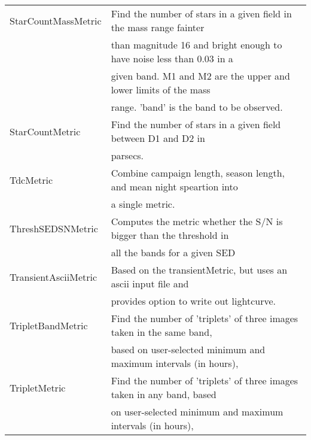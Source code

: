 \begin{table}
\begin{tabular}{ll}
 StarCountMassMetric &  Find the number of stars in a given field in the mass range fainter \\
  &  than magnitude 16 and bright enough to have noise less than 0.03 in a \\
  &  given band. M1 and M2 are the upper and lower limits of the mass \\
  &  range. 'band' is the band to be observed. \\
 StarCountMetric &  Find the number of stars in a given field between D1 and D2 in \\
  &  parsecs. \\
 TdcMetric &  Combine campaign length, season length, and mean night speartion into \\
  &  a single metric. \\
 ThreshSEDSNMetric &  Computes the metric whether the S/N is bigger than the threshold in \\
  &  all the bands for a given SED \\
 TransientAsciiMetric &  Based on the transientMetric, but uses an ascii input file and \\
  &  provides option to write out lightcurve. \\
 TripletBandMetric &  Find the number of 'triplets' of three images taken in the same band, \\
  &  based on user-selected minimum and maximum intervals (in hours), \\
 TripletMetric &  Find the number of 'triplets' of three images taken in any band, based \\
  &  on user-selected minimum and maximum intervals (in hours), \\
\hline
\end{tabular}

\end{table}